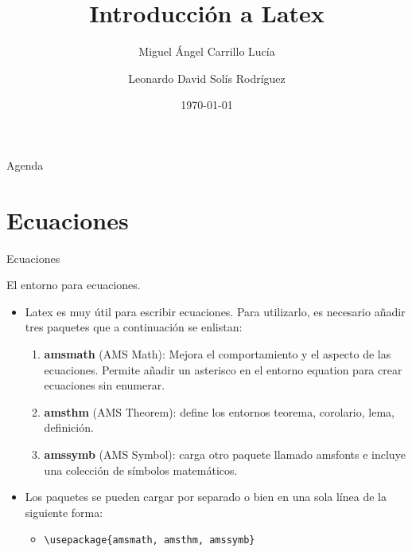 \documentclass[aspectratio=169, 10pt]{beamer}
\title[\hspace{25mm} \insertframenumber/\inserttotalframenumber]{\bf Introducción a Latex}
\author[Taller de Herramientas Computacionales - 2024-1] %
{\hspace{2.70mm} \Large{Miguel Ángel Carrillo Lucía}  \and \Large{Leonardo David Solís Rodríguez}} %
\institute[] %
{
    \large{Universidad Nacional Autónoma de México}\\
    \large{Facultad de Ciencias}\\
    \large{Departamento de Matemáticas}\\
    \large{Licenciatura en Matemáticas Aplicadas}
}
\date{\today}
\begin{document}

\begin{frame}
    \titlepage
\end{frame}

\begin{frame}{Agenda}
     \tableofcontents[sectionstyle=show,subsectionstyle=show/shaded/hide,subsubsectionstyle=show/shaded/hide]
\end{frame}



\section{Ecuaciones}

\begin{frame}[fragile]{Ecuaciones}
    \begin{alertblock}{El entorno para ecuaciones.}
        \begin{itemize}
            \item Latex es muy útil para escribir ecuaciones. Para utilizarlo, es necesario añadir tres paquetes que a continuación se enlistan:
            \begin{enumerate}
                \item \textbf{amsmath} (AMS Math): Mejora el comportamiento y el aspecto de las ecuaciones. Permite añadir un asterisco en el entorno equation para crear ecuaciones sin enumerar.
                \item \textbf{amsthm} (AMS Theorem): define los entornos teorema, corolario, lema, definición.
                \item \textbf{amssymb} (AMS Symbol): carga otro paquete llamado amsfonts e incluye una colección de símbolos matemáticos.
            \end{enumerate}
            \item Los paquetes se pueden cargar por separado o bien en una sola línea de la siguiente forma:
            \begin{itemize}
                \item \verb|\usepackage{amsmath, amsthm, amssymb}|
            \end{itemize}
        \end{itemize}
    \end{alertblock}
\end{frame}
\end{document}

